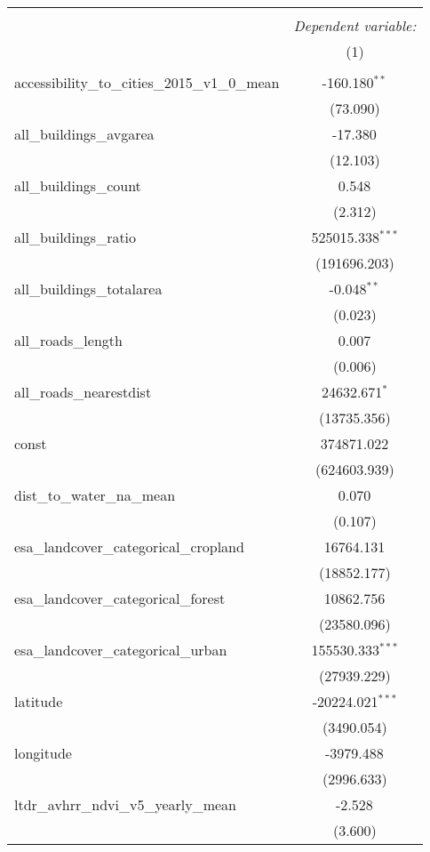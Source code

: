 \begin{table}[!htbp] \centering
\begin{tabular}{@{\extracolsep{5pt}}lc}
\\[-1.8ex]\hline
\hline \\[-1.8ex]
& \multicolumn{1}{c}{\textit{Dependent variable:}} \
\cr \cline{1-2}
\\[-1.8ex] & (1) \\
\hline \\[-1.8ex]
 accessibility_to_cities_2015_v1_0_mean & -160.180$^{**}$ \\
  & (73.090) \\
 all_buildings_avgarea & -17.380$^{}$ \\
  & (12.103) \\
 all_buildings_count & 0.548$^{}$ \\
  & (2.312) \\
 all_buildings_ratio & 525015.338$^{***}$ \\
  & (191696.203) \\
 all_buildings_totalarea & -0.048$^{**}$ \\
  & (0.023) \\
 all_roads_length & 0.007$^{}$ \\
  & (0.006) \\
 all_roads_nearestdist & 24632.671$^{*}$ \\
  & (13735.356) \\
 const & 374871.022$^{}$ \\
  & (624603.939) \\
 dist_to_water_na_mean & 0.070$^{}$ \\
  & (0.107) \\
 esa_landcover_categorical_cropland & 16764.131$^{}$ \\
  & (18852.177) \\
 esa_landcover_categorical_forest & 10862.756$^{}$ \\
  & (23580.096) \\
 esa_landcover_categorical_urban & 155530.333$^{***}$ \\
  & (27939.229) \\
 latitude & -20224.021$^{***}$ \\
  & (3490.054) \\
 longitude & -3979.488$^{}$ \\
  & (2996.633) \\
 ltdr_avhrr_ndvi_v5_yearly_mean & -2.528$^{}$ \\
  & (3.600) \\

\end{tabular}
\end{table}
